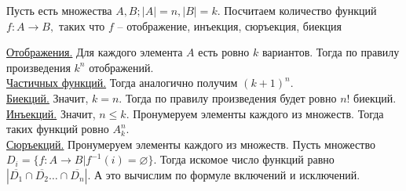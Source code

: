 \begin{example}
    Пусть есть множества $A, B; |A| = n, |B| = k.$ Посчитаем количество функций $f: A \rightarrow B,$ таких что $f$ -- отображение, инъекция, сюръекция, биекция
\end{example}
\begin{solution}
    \underline{Отображения.} Для каждого элемента $A$ есть ровно $k$ вариантов. Тогда по правилу произведения $k^n$ отображений.
    \\
    \underline{Частичных функций.} Тогда аналогично получим $(k + 1) ^ n.$
    \\
    \underline{Биекций.} Значит, $k = n.$ Тогда по правилу произведения будет ровно $n!$ биекций.
    \\
    \underline{Инъекций.} Значит, $n \leq k.$ Пронумеруем элементы каждого из множеств. Тогда таких функций ровно $A_{k}^{n}.$
    \\
    \underline{Сюръекций.} Пронумеруем элементы каждого из множеств. Пусть множество $D_i = \{ f: A\rightarrow B |f^{-1}(i) = \varnothing\}.$ Тогда искомое число функций равно $|\overline{D_1} \cap \overline{D_2} \ldots \cap \overline{D_n}|.$ А это вычислим по формуле включений и исключений.
\end{solution}